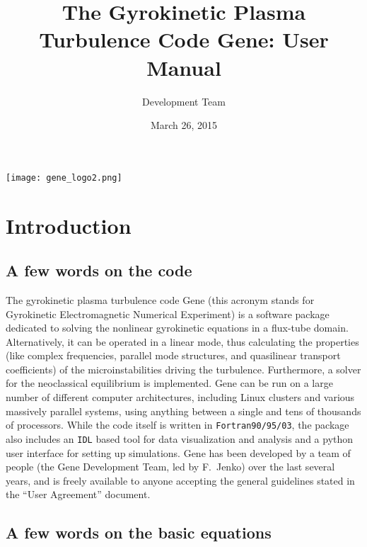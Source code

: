 \documentclass[12pt]{article}
\begin{document}
\title{The Gyrokinetic Plasma Turbulence Code {\sc Gene}: User Manual}
\vspace{1cm}
\date{\Large March 26, 2015}
\author{\gene Development Team}

\maketitle

\vspace{2cm}
\begin{center}
\texttt{[image: gene\_logo2.png]}
\end{center}

\thispagestyle{empty}
\newpage

\tableofcontents

\newpage
\section{Introduction}
\label{sec:intro}

\subsection{A few words on the code}
The gyrokinetic plasma turbulence code {\sc Gene} (this acronym stands for Gyrokinetic Electromagnetic
Numerical Experiment) is a software package dedicated to solving the nonlinear gyrokinetic
equations in a flux-tube domain. Alternatively, it can be operated in a linear mode, thus
calculating the properties (like complex frequencies, parallel mode structures, and quasilinear
transport coefficients) of the microinstabilities driving the turbulence. Furthermore, a solver for the neoclassical
equilibrium is implemented. {\sc Gene} can be run on
a large number of different computer architectures, including Linux clusters and various massively
parallel systems, using anything between a single and tens of thousands of processors. While the code
itself is written in {\tt Fortran90/95/03}, the package also includes an {\tt IDL} based tool for data
visualization and analysis and a python user interface for setting up simulations. {\sc Gene} has been developed
by a team of people (the Gene Development Team, led by F.~Jenko) over the last several years, and is
freely available to anyone accepting the general guidelines stated in the ``User Agreement'' document.


\subsection{A few words on the basic equations}
\end{document}
